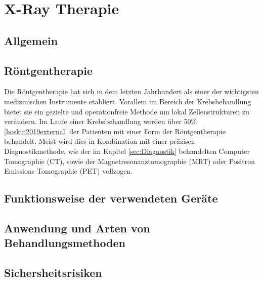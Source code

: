 \section{X-Ray Therapie}

\subsection{Allgemein}


\subsection{Röntgentherapie}
Die Röntgentherapie hat sich in dem letzten Jahrhundert als einer der wichtigsten medizinischen Instrumente etabliert.
Vorallem im Bereich der Krebsbehandlung bietet sie ein gezielte und operationfreie Methode um lokal Zellenstrukturen zu verändern.
Im Laufe einer Krebsbehandlung werden über 50\% \ref{hoskin2019external} der Patienten mit einer Form der Röntgentherapie behandelt.
Meist wird dies in Kombination mit einer präzisen Diagnostikmethode, wie der im Kapitel \ref{sec:Diagnostik} behandelten Computer Tomographie (CT), sowie
der Magnetresonanztomographie (MRT) oder Positron Emissions Tomographie (PET) vollzogen.



\subsection{Funktionsweise der verwendeten Geräte}

\subsection{Anwendung und Arten von Behandlungsmethoden}

\subsection{Sichersheitsrisiken}

